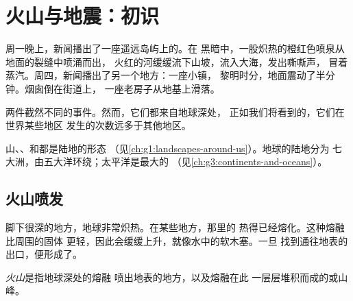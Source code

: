 \chapter{火山与地震：初识}\label{ch:g4:volcanoes-earthquakes-first-look}

周一晚上，新闻播出了一座遥远岛屿上的。在
黑暗中，一股炽热的橙红色喷泉从地面的裂缝中喷涌而出，
火红的河缓缓流下山坡，流入大海，发出嘶嘶声，
冒着蒸汽。周四，新闻播出了另一个地方：一座小镇，
黎明时分，地面震动了半分钟。烟囱倒在街道上，
一座老房子从地基上滑落。

两件截然不同的事件。然而，它们都来自地球深处，
正如我们将看到的，它们在世界某些地区
发生的次数远多于其他地区。

\begin{recall}
山、、和都是陆地的形态
（见\cref{ch:g1:landscapes-around-us}）。地球的陆地分为
七大洲，由五大洋环绕；太平洋是最大的
（见\cref{ch:g3:continents-and-oceans}）。
\end{recall}

\section{火山喷发}

脚下很深的地方，地球非常炽热。在某些地方，那里的
热得已经熔化。这种熔融比周围的固体
更轻，因此会缓缓上升，就像水中的软木塞。一旦
找到通往地表的出口，便形成了。

\begin{definition}[火山]\label{def:g4:volcanoes-earthquakes-first-look:volcano}
\emph{火山}是指地球深处的熔融
喷出地表的地方，以及熔融在此
一层层堆积而成的或山峰。
\end{definition}

